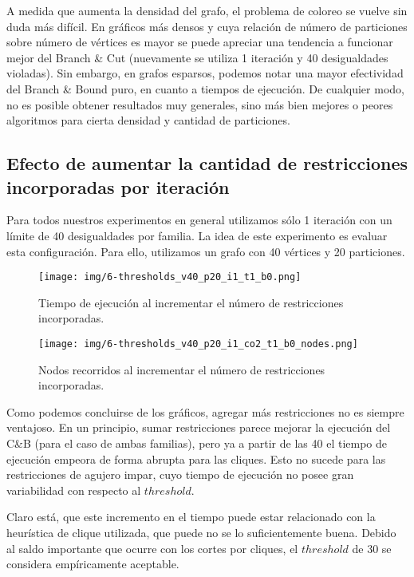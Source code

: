 A medida que aumenta la densidad del grafo, el problema de coloreo se vuelve sin duda más difícil. En gráficos más densos y cuya relación de número de particiones sobre número de vértices es mayor se puede apreciar una tendencia a funcionar mejor del Branch \& Cut (nuevamente se utiliza 1 iteración y 40 desigualdades violadas). Sin embargo, en grafos esparsos, podemos notar una mayor efectividad del Branch \& Bound puro, en cuanto a tiempos de ejecución. De cualquier modo, no es posible obtener resultados muy generales, sino más bien mejores o peores algoritmos para cierta densidad y cantidad de particiones.

\pagebreak

\subsection{Efecto de aumentar la cantidad de restricciones incorporadas por iteración}

Para todos nuestros experimentos en general utilizamos sólo 1 iteración con un límite de 40 desigualdades por familia. La idea de este experimento es evaluar esta configuración. Para ello, utilizamos un grafo con 40 vértices y 20 particiones.

\begin{figure}[h]
  \centering
  \begin{minipage}[b]{0.49\textwidth}
    \texttt{[image: img/6-thresholds\_v40\_p20\_i1\_t1\_b0.png]}
    \caption{Tiempo de ejecución al incrementar el número de restricciones incorporadas.}
  \end{minipage}
  \hfill
  \begin{minipage}[b]{0.49\textwidth}
    \texttt{[image: img/6-thresholds\_v40\_p20\_i1\_co2\_t1\_b0\_nodes.png]}
    \caption{Nodos recorridos al incrementar el número de restricciones incorporadas.}
  \end{minipage}
\end{figure}

Como podemos concluirse de los gráficos, agregar más restricciones no es siempre ventajoso. En un principio, sumar restricciones parece mejorar la ejecución del C\&B (para el caso de ambas familias), pero ya a partir de las 40 el tiempo de ejecución empeora de forma abrupta para las cliques. Esto no sucede para las restricciones de agujero impar, cuyo tiempo de ejecución no posee gran variabilidad con respecto al $threshold$.

Claro está, que este incremento en el tiempo puede estar relacionado con la heurística de clique utilizada, que puede no se lo suficientemente buena. Debido al saldo importante que ocurre con los cortes por cliques, el $threshold$ de 30 se considera empíricamente aceptable.

